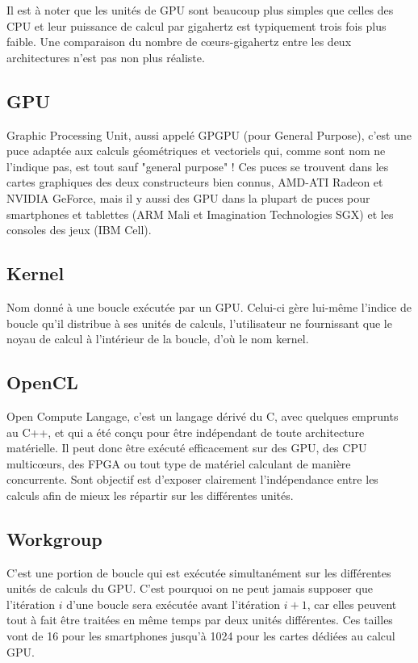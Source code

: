 \documentclass[a4paper,12pt]{article}
\begin{document}
Il est à noter que les unités de GPU sont beaucoup plus simples que celles des CPU et leur puissance de calcul par gigahertz est typiquement trois fois plus faible. Une comparaison du nombre de c\oe urs-gigahertz entre les deux architectures n'est pas non plus réaliste.

\subsection{GPU}
Graphic Processing Unit, aussi appelé GPGPU (pour General Purpose), c'est une puce adaptée aux calculs géométriques et vectoriels qui, comme sont nom ne l'indique pas, est tout sauf "general purpose" !
Ces puces se trouvent dans les cartes graphiques des deux constructeurs bien connus, AMD-ATI Radeon et NVIDIA GeForce, mais il y aussi des GPU dans la plupart de puces pour smartphones et tablettes (ARM Mali et Imagination Technologies SGX) et les consoles des jeux (IBM Cell).

\subsection{Kernel}
Nom donné à une boucle exécutée par un GPU. Celui-ci gère lui-même l'indice de boucle qu'il distribue à ses unités de calculs, l'utilisateur ne fournissant que le noyau de calcul à l'intérieur de la boucle, d'où le nom kernel.

\subsection{OpenCL}
Open Compute Langage, c'est un langage dérivé du C, avec quelques emprunts au C++, et qui a été conçu pour être indépendant de toute architecture matérielle. Il peut donc être exécuté efficacement sur des GPU, des CPU multic\oe urs, des FPGA ou tout type de matériel calculant de manière concurrente. Sont objectif est d'exposer clairement l'indépendance entre les calculs afin de mieux les répartir sur les différentes unités.

\subsection{Workgroup}
C'est une portion de boucle qui est exécutée simultanément sur les différentes unités de calculs du GPU. C'est pourquoi on ne peut jamais supposer que l'itération $i$ d'une boucle sera exécutée avant l'itération $i+1$, car elles peuvent tout à fait être traitées en même temps par deux unités différentes. Ces tailles vont de 16 pour les smartphones jusqu'à 1024 pour les cartes dédiées au calcul GPU.
\end{document}
